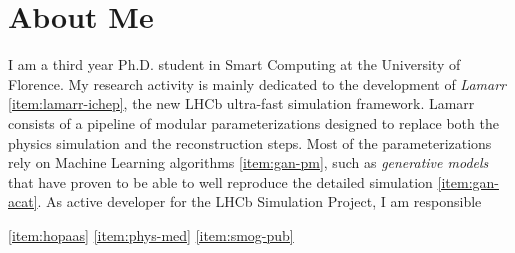 \section*{About Me}
\begin{cvcontent}
  I am a third year Ph.D. student in Smart Computing at the 
  University of Florence. My research activity is mainly 
  dedicated to the development of \emph{Lamarr} 
  \ref{item:lamarr-ichep}, the new LHCb ultra-fast 
  simulation framework. Lamarr consists of a pipeline 
  of modular parameterizations designed to replace both 
  the physics simulation and the reconstruction steps.
  Most of the parameterizations rely on Machine Learning 
  algorithms \ref{item:gan-pm}, such as \emph{generative
  models} that have proven to be able to well reproduce 
  the detailed simulation \ref{item:gan-acat}. As active 
  developer for the LHCb Simulation Project, I am responsible
  
  
  
  
  
  \ref{item:hopaas}
  \ref{item:phys-med}
  \ref{item:smog-pub}
\end{cvcontent}